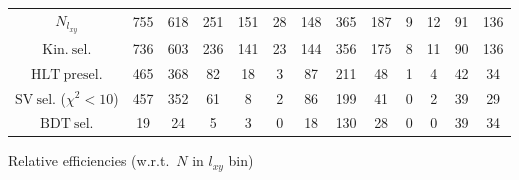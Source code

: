 \documentclass[10pt,a4paper]{article}
\begin{document}
\begin{landscape}
{\begin{tabular}{c|cccc|cccc|cccc}
\midrule
$N_{l_{xy}}$ & 755 & 618 & 251 & 151 & 28 & 148 & 365 & 187 & 9 & 12 & 91 & 136\\
$\mathrm{Kin.\ sel.}$ & 736 & 603 & 236 & 141 & 23 & 144 & 356 & 175 & 8 & 11 & 90 & 136\\
$\mathrm{HLT\ presel.}$ & 465 & 368 & 82 & 18 & 3 & 87 & 211 & 48 & 1 & 4 & 42 & 34\\
$\mathrm{SV\ sel.}$ ($\chi^2{<}10$) & 457 & 352 & 61 & 8 & 2 & 86 & 199 & 41 & 0 & 2 & 39 & 29\\
$\mathrm{BDT\ sel.}$ & 19 & 24 & 5 & 3 & 0 & 18 & 130 & 28 & 0 & 0 & 39 & 34\\
\bottomrule
\end{tabular}}

\vspace{18pt}

Relative efficiencies (w.r.t.\ $N$ in $l_{xy}$ bin)


\end{landscape}
\end{document}
